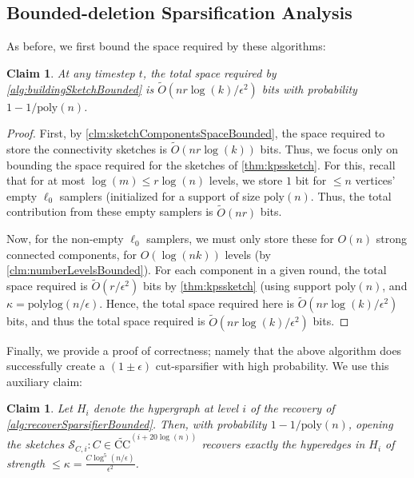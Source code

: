 \documentclass[11pt]{article}
\newtheorem{claim}[theorem]{Claim}
\theoremstyle{definition}
\newcommand{\eps}{\epsilon}
\newcommand{\polylog}{\mathrm{polylog}}
\begin{document}
\subsection{Bounded-deletion Sparsification Analysis}

As before, we first bound the space required by these algorithms:

\begin{claim}\label{clm:sketchSpaceBounded}
	At any timestep $t$, the total space required by \cref{alg:buildingSketchBounded} is $\widetilde{O}(nr\log(k) / \eps^2)$ bits with probability $1 - 1 / \mathrm{poly}(n)$.
\end{claim}

\begin{proof}
	First,  by \cref{clm:sketchComponentsSpaceBounded}, the space required to store the connectivity sketches is $\widetilde{O}(n r \log(k))$ bits. Thus, we focus only on bounding the space required for the sketches of \cref{thm:kpssketch}. For this, recall that for at most $\log(m) \leq r \log(n)$ levels, we store $1$ bit for $\leq n$ vertices' empty $\ell_0$ samplers (initialized for a support of size $\mathrm{poly}(n)$. Thus, the total contribution from these empty samplers is $\widetilde{O}(nr)$ bits. 
	
	Now, for the non-empty $\ell_0$ samplers, we must only store these for $O(n)$ strong connected components, for $O(\log(nk))$ levels (by \cref{clm:numberLevelsBounded}). For each component in a given round, the total space required is $\widetilde{O}(r  / \eps^2)$ bits by \cref{thm:kpssketch} (using support $\mathrm{poly}(n)$, and $\kappa = \polylog(n / \eps)$. Hence, the total space required here is $\widetilde{O}(nr \log(k)/ \eps^2)$ bits, and thus the total space required is $\widetilde{O}(nr \log(k)/ \eps^2)$ bits.
\end{proof}

Finally, we provide a proof of correctness; namely that the above algorithm does successfully create a $(1 \pm \eps)$ cut-sparsifier with high probability. We use this auxiliary claim:

\begin{claim}\label{clm:recoversLowStrengthBounded}
	Let $H_i$ denote the hypergraph at level $i$ of the recovery of \cref{alg:recoverSparsifierBounded}. Then, with probability $1 - 1 / \mathrm{poly}(n)$, opening the sketches $\mathcal{S}_{C, i}: C \in \widetilde{\mathrm{CC}}^{(i + 20 \log(n))}$ recovers exactly the hyperedges in $H_i$ of strength $\leq \kappa =  \frac{C \log^5(n / \eps)}{ \eps^2}$.
\end{claim}
\end{document}
